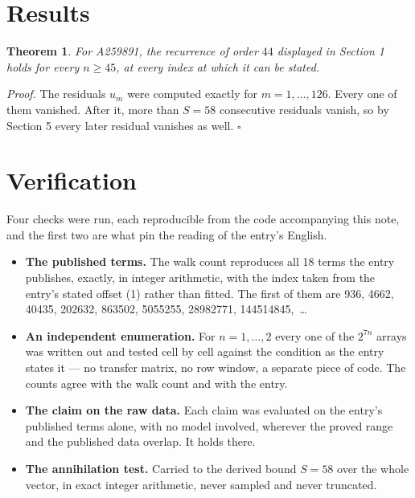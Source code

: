 \documentclass[11pt]{article}
\newtheorem{theorem}{Theorem}
\theoremstyle{definition}
\begin{document}
\section{Results}

\begin{theorem} For A259891, the recurrence of order $44$ displayed in Section 1 holds for every $n \ge 45$, at every index at which it can be stated.\end{theorem}

{\itshape Proof.} The residuals $u_m$ were computed exactly for $m = 1,\dots,126$. Every one of them vanished. After it, more than $S = 58$ consecutive residuals vanish, so by Section 5 every later residual vanishes as well. $\square$

\section{Verification}

Four checks were run, each reproducible from the code accompanying this note, and the first two are what pin the reading of the entry's English.

\begin{itemize}

\item {\bfseries The published terms.} The walk count reproduces all 18 terms the entry publishes, exactly, in integer arithmetic, with the index taken from the entry's stated offset (1) rather than fitted. The first of them are 936, 4662, 40435, 202632, 863502, 5055255, 28982771, 144514845,~\dots

\item {\bfseries An independent enumeration.} For $n = 1,\dots,2$ every one of the $2^{7n}$ arrays was written out and tested cell by cell against the condition as the entry states it --- no transfer matrix, no row window, a separate piece of code. The counts agree with the walk count and with the entry.

\item {\bfseries The claim on the raw data.} Each claim was evaluated on the entry's published terms alone, with no model involved, wherever the proved range and the published data overlap. It holds there.

\item {\bfseries The annihilation test.} Carried to the derived bound $S = 58$ over the whole vector, in exact integer arithmetic, never sampled and never truncated.

\end{itemize}
\end{document}
